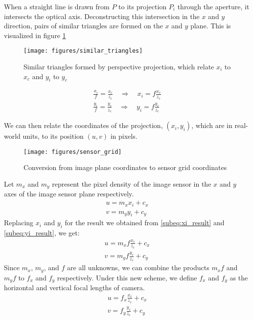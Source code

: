 When a straight line is drawn from $P$ to its projection $P_i$ through the aperture, it intersects the optical axis. Deconstructing this intersection in the $x$ and $y$ direction, pairs of similar triangles are formed on the $x$ and $y$ plane. This is visualized in figure \ref{fig:similar_triangles}
\begin{figure}[H] \label{fig:similar_triangles}
    \centering
    \texttt{[image: figures/similar\_triangles]}
    \caption{Similar triangles formed by perspective projection, which relate $x_i$ to $x_c$ and $y_i$ to $y_c$}
\end{figure}

\begin{subequations}
    \begin{gather}
        \frac{x_i}{f} = \frac{x_c}{z_c} \quad \Longrightarrow \quad x_i = f \frac{x_c}{z_c} \label{subeq:xi_result}\\
        \frac{y_i}{f} = \frac{y_c}{z_c} \quad \Longrightarrow \quad y_i = f \frac{y_c}{z_c} \label{subeq:yi_result}
    \end{gather}
\end{subequations}

We can then relate the coordinates of the projection, $(x_i, y_i)$, which are in real-world units, to its position $(u, v)$ in pixels.
\begin{figure}[H]
    \centering
    \texttt{[image: figures/sensor\_grid]}
    \caption{Conversion from image plane coordinates to sensor grid coordinates}
\end{figure}
Let $m_x$ and $m_y$ represent the pixel density of the image sensor in the $x$ and $y$ axes of the image sensor plane respectively.
\begin{align*}
    u = m_x x_i + c_x \\
    v = m_y y_i + c_y
\end{align*}
Replacing $x_i$ and $y_i$ for the result we obtained from \ref{subeq:xi_result} and \ref{subeq:yi_result}, we get:
\begin{align*}
    u = m_x f \frac{x_c}{z_c} + c_x \\
    v = m_y f \frac{y_c}{z_c} + c_y
\end{align*}
Since $m_x$, $m_y$, and $f$ are all unknowns, we can combine the products $m_x f$ and $m_y f$ to $f_x$ and $f_y$ respectively. Under this new scheme, we define $f_x$ and $f_y$ as the horizontal and vertical focal lengths of camera.
\begin{subequations}
    \begin{gather}
        u = f_x \frac{x_c}{z_c} + c_x \\
        v = f_y \frac{y_c}{z_c} + c_y
    \end{gather}
\end{subequations}

